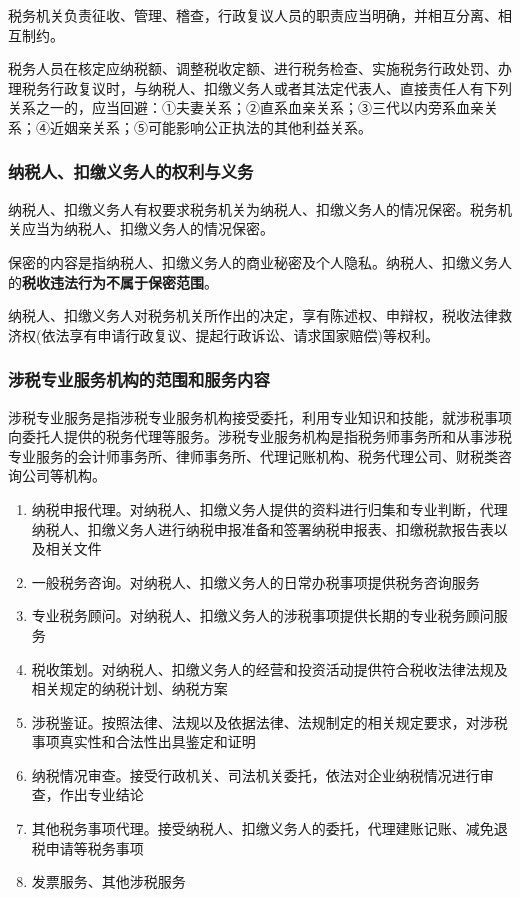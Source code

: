 \documentclass[UTF8,12pt]{ctexart}
\numberwithin{equation}{section} %
\numberwithin{figure}{section}
\numberwithin{table}{section}
\begin{document}
	税务机关负责征收、管理、稽查，行政复议人员的职责应当明确，并相互分离、相互制约。
	
	税务人员在核定应纳税额、调整税收定额、进行税务检查、实施税务行政处罚、办理税务行政复议时，与纳税人、扣缴义务人或者其法定代表人、直接责任人有下列关系之一的，应当回避：①夫妻关系；②直系血亲关系；③三代以内旁系血亲关系；④近姻亲关系；⑤可能影响公正执法的其他利益关系。
	
	\subsubsection{纳税人、扣缴义务人的权利与义务}
	纳税人、扣缴义务人有权要求税务机关为纳税人、扣缴义务人的情况保密。税务机关应当为纳税人、扣缴义务人的情况保密。
	
	保密的内容是指纳税人、扣缴义务人的商业秘密及个人隐私。纳税人、扣缴义务人的\textbf{税收违法行为不属于保密范围}。
	
	纳税人、扣缴义务人对税务机关所作出的决定，享有陈述权、申辩权，税收法律救济权(依法享有申请行政复议、提起行政诉讼、请求国家赔偿)等权利。
	
	\subsubsection{涉税专业服务机构的范围和服务内容}
	涉税专业服务是指涉税专业服务机构接受委托，利用专业知识和技能，就涉税事项向委托人提供的税务代理等服务。涉税专业服务机构是指税务师事务所和从事涉税专业服务的会计师事务所、律师事务所、代理记账机构、税务代理公司、财税类咨询公司等机构。
	\begin{enumerate}
		\item 纳税申报代理。对纳税人、扣缴义务人提供的资料进行归集和专业判断，代理纳税人、扣缴义务人进行纳税申报准备和签署纳税申报表、扣缴税款报告表以及相关文件
		
		\item 一般税务咨询。对纳税人、扣缴义务人的日常办税事项提供税务咨询服务
		
		\item 专业税务顾问。对纳税人、扣缴义务人的涉税事项提供长期的专业税务顾问服务
		
		\item 税收策划。对纳税人、扣缴义务人的经营和投资活动提供符合税收法律法规及相关规定的纳税计划、纳税方案
		
		\item 涉税鉴证。按照法律、法规以及依据法律、法规制定的相关规定要求，对涉税事项真实性和合法性出具鉴定和证明
		
		\item 纳税情况审查。接受行政机关、司法机关委托，依法对企业纳税情况进行审查，作出专业结论
		
		\item 其他税务事项代理。接受纳税人、扣缴义务人的委托，代理建账记账、减免退税申请等税务事项
		
		\item 发票服务、其他涉税服务
	\end{enumerate}
	
\end{document}
